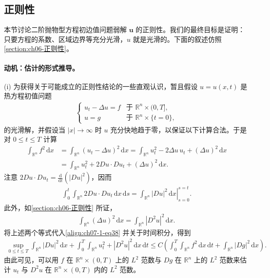 \documentclass[../../main.tex]{subfiles}
\begin{document}
\subsection{正则性}\label{subsection:ch07-1-3-正则性}

本节讨论二阶抛物型方程初边值问题弱解 $\mathbf{u}$ 的正则性。我们的最终目标是证明：只要方程的系数、区域边界等充分光滑，$u$ 就是光滑的。下面的叙述仿照\cref{section:ch06-正则性}。

\paragraph{动机：估计的形式推导。}(i) 为获得关于可能成立的正则性结论的一些直观认识，暂且假设 $u=u(x,t)$ 是热方程初值问题
\begin{align}
\begin{cases}
u_t-\Delta u = f & \text{于 } \mathbb{R}^n\times(0,T],\\
u = g & \text{于 } \mathbb{R}^n\times\{t=0\},
\end{cases}\label{align:ch07-1-eq37}
\end{align}
的光滑解，并假设当 $|x|\to\infty$ 时 $u$ 充分快地趋于零，以保证以下计算合法。于是对 $0\leqslant t\leqslant T$ 计算
\begin{align}
\int_{\mathbb{R}^n} f^2\,\mathrm{d}x &= \int_{\mathbb{R}^n}(u_t-\Delta u)^2\,\mathrm{d}x = \int_{\mathbb{R}^n} u_t^2 - 2\Delta u\,u_t + (\Delta u)^2\,\mathrm{d}x\nonumber\\
&= \int_{\mathbb{R}^n} u_t^2 + 2Du\cdot Du_t + (\Delta u)^2\,\mathrm{d}x.\label{align:ch07-1-eq38}
\end{align}
注意 $2Du\cdot Du_t = \frac{\mathrm{d}}{\mathrm{d}t}(|Du|^2)$，因而
\begin{align*}
\int_0^t\int_{\mathbb{R}^n} 2Du\cdot Du_t\,\mathrm{d}x\,\mathrm{d}s = \left.\int_{\mathbb{R}^n}|Du|^2\,\mathrm{d}x\right|_{s=0}^{s=t}.
\end{align*}
此外，如\cref{section:ch06-正则性} 所证，
\begin{align*}
\int_{\mathbb{R}^n}(\Delta u)^2\,\mathrm{d}x = \int_{\mathbb{R}^n}|D^2u|^2\,\mathrm{d}x.
\end{align*}
将上述两个等式代入\eqref{align:ch07-1-eq38} 并关于时间积分，得到
\begin{align}
\sup_{0\leqslant t\leqslant T}\int_{\mathbb{R}^n}|Du|^2\,\mathrm{d}x + \int_0^T\int_{\mathbb{R}^n} u_t^2+|D^2u|^2\,\mathrm{d}x\,\mathrm{d}t
\leqslant C\left(\int_0^T\int_{\mathbb{R}^n} f^2\,\mathrm{d}x\,\mathrm{d}t + \int_{\mathbb{R}^n}|Dg|^2\,\mathrm{d}x\right).\label{align:ch07-1-eq39}
\end{align}
由此可见，可以用 $f$ 在 $\mathbb{R}^n\times(0,T)$ 上的 $L^2$ 范数与 $Dg$ 在 $\mathbb{R}^n$ 上的 $L^2$ 范数来估计 $u_t$ 与 $D^2u$ 在 $\mathbb{R}^n\times(0,T)$ 内的 $L^2$ 范数。
\end{document}
